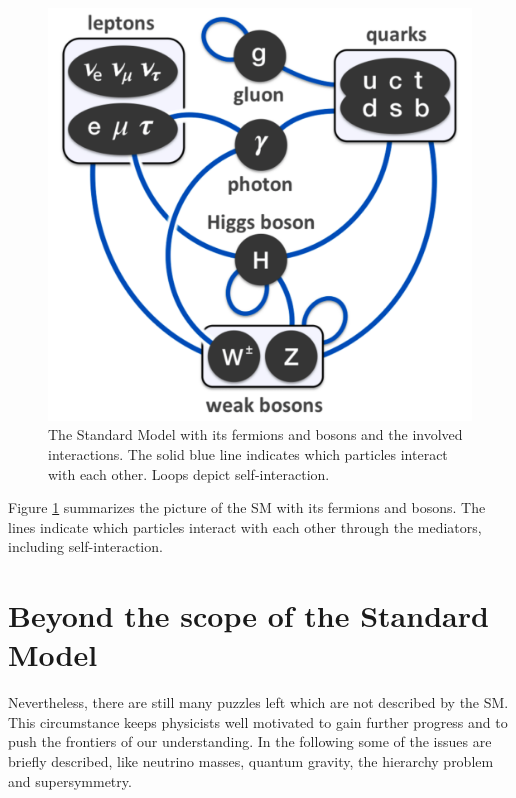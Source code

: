 %
\begin{figure}[htbp]                                 
 \begin{center}                                       
  \includegraphics[width=0.5\linewidth]{figures/SMpic.pdf} 
   \caption[Overview of the Standard Model.]{The Standard Model with its fermions and bosons and the involved interactions. The solid blue line indicates which particles interact with each other. Loops depict self-interaction. \cite{SMpic}}
  \label{SMpic}                                     
 \end{center}
\end{figure}
%
Figure \ref{SMpic} summarizes the picture of the SM with its fermions and bosons. The lines indicate which particles interact with each other through the mediators, including self-interaction.
\section{Beyond the scope of the Standard Model}\label{beyondSM}
Nevertheless, there are still many puzzles left which are not described by the SM. This circumstance keeps physicists well motivated to gain further progress and to push the frontiers of our understanding. \cite{Nair} In the following some of the issues are briefly described, like neutrino masses, quantum gravity, the hierarchy problem and supersymmetry.
